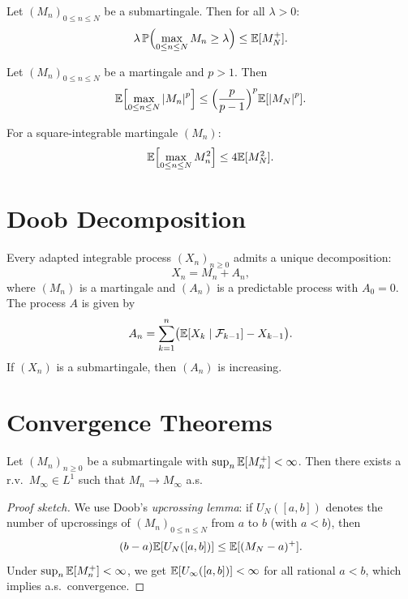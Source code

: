 \begin{theorem}
\label{thm:doob_maximal}
Let $(M_n)_{0 \leq n \leq N}$ be a submartingale. Then for all $\lambda > 0$:
\[
  \lambda \, \mathbb{P}\Bigl(\max_{0 \leq n \leq N} M_n \geq \lambda\Bigr)
  \leq \mathbb{E}[M_N^+].
\]
\end{theorem}

\begin{theorem}
\label{thm:doob_Lp}
Let $(M_n)_{0 \leq n \leq N}$ be a martingale and $p > 1$. Then
\[
  \mathbb{E}\Bigl[\max_{0 \leq n \leq N} \left| M_n \right|^p\Bigr]
  \leq \Bigl(\frac{p}{p-1}\Bigr)^p \mathbb{E}[\left| M_N \right|^p].
\]
\end{theorem}

\begin{theorem}
\label{thm:doob_L2}
For a square-integrable martingale $(M_n)$:
\[
  \mathbb{E}\Bigl[\max_{0 \leq n \leq N} M_n^2\Bigr] \leq 4 \mathbb{E}[M_N^2].
\]
\end{theorem}

\section{Doob Decomposition}

\begin{theorem}
\label{thm:doob_decomp}
Every adapted integrable process $(X_n)_{n \geq 0}$ admits a unique decomposition:
\[
  X_n = M_n + A_n,
\]
where $(M_n)$ is a martingale and $(A_n)$ is a predictable process with $A_0 = 0$.
The process $A$ is given by
\[
  A_n = \sum_{k=1}^{n} \bigl(\mathbb{E}[X_k \mid \mathcal{F}_{k-1}] - X_{k-1}\bigr).
\]
If $(X_n)$ is a submartingale, then $(A_n)$ is increasing.
\end{theorem}

\section{Convergence Theorems}

\begin{theorem}
\label{thm:doob_convergence}
Let $(M_n)_{n \geq 0}$ be a submartingale with $\sup_n \mathbb{E}[M_n^+] < \infty$.
Then there exists a r.v.\ $M_{\infty} \in L^1$ such that $M_n \to M_{\infty}$
a.s.
\end{theorem}

\begin{proof}[Proof sketch]
We use Doob's \emph{upcrossing lemma}: if $U_N([a,b])$ denotes the number of
upcrossings of $(M_n)_{0 \leq n \leq N}$ from $a$ to $b$ (with $a < b$), then
\[
  (b - a) \mathbb{E}[U_N([a,b])] \leq \mathbb{E}[(M_N - a)^+].
\]
Under $\sup_n \mathbb{E}[M_n^+] < \infty$, we get $\mathbb{E}[U_{\infty}([a,b])] < \infty$
for all rational $a < b$, which implies a.s.\ convergence.
\end{proof}

